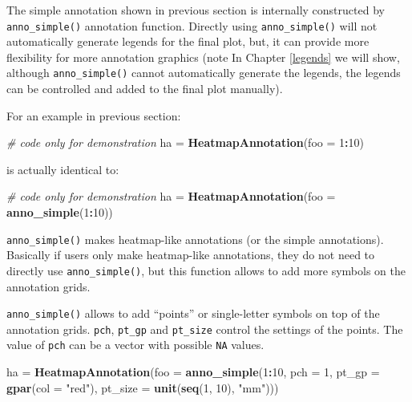 \documentclass[]{book}
\newenvironment{Shaded}{\begin{snugshade}}{\end{snugshade}}
\newcommand{\KeywordTok}[1]{\textcolor[rgb]{0.13,0.29,0.53}{\textbf{#1}}}
\newcommand{\DataTypeTok}[1]{\textcolor[rgb]{0.13,0.29,0.53}{#1}}
\newcommand{\DecValTok}[1]{\textcolor[rgb]{0.00,0.00,0.81}{#1}}
\newcommand{\StringTok}[1]{\textcolor[rgb]{0.31,0.60,0.02}{#1}}
\newcommand{\CommentTok}[1]{\textcolor[rgb]{0.56,0.35,0.01}{\textit{#1}}}
\newcommand{\OperatorTok}[1]{\textcolor[rgb]{0.81,0.36,0.00}{\textbf{#1}}}
\newcommand{\NormalTok}[1]{#1}
\theoremstyle{definition}
\theoremstyle{definition}
\theoremstyle{definition}
\theoremstyle{remark}
\begin{document}
The simple annotation shown in previous section is internally
constructed by \texttt{anno\_simple()} annotation function. Directly
using \texttt{anno\_simple()} will not automatically generate legends
for the final plot, but, it can provide more flexibility for more
annotation graphics (note In Chapter \ref{legends} we will show,
although \texttt{anno\_simple()} cannot automatically generate the
legends, the legends can be controlled and added to the final plot
manually).

For an example in previous section:

\begin{Shaded}
\begin{Highlighting}[]
\CommentTok{# code only for demonstration}
\NormalTok{ha =}\StringTok{ }\KeywordTok{HeatmapAnnotation}\NormalTok{(}\DataTypeTok{foo =} \DecValTok{1}\OperatorTok{:}\DecValTok{10}\NormalTok{)}
\end{Highlighting}
\end{Shaded}

is actually identical to:

\begin{Shaded}
\begin{Highlighting}[]
\CommentTok{# code only for demonstration}
\NormalTok{ha =}\StringTok{ }\KeywordTok{HeatmapAnnotation}\NormalTok{(}\DataTypeTok{foo =} \KeywordTok{anno_simple}\NormalTok{(}\DecValTok{1}\OperatorTok{:}\DecValTok{10}\NormalTok{))}
\end{Highlighting}
\end{Shaded}

\texttt{anno\_simple()} makes heatmap-like annotations (or the simple
annotations). Basically if users only make heatmap-like annotations,
they do not need to directly use \texttt{anno\_simple()}, but this
function allows to add more symbols on the annotation grids.

\texttt{anno\_simple()} allows to add ``points'' or single-letter
symbols on top of the annotation grids. \texttt{pch}, \texttt{pt\_gp}
and \texttt{pt\_size} control the settings of the points. The value of
\texttt{pch} can be a vector with possible \texttt{NA} values.

\begin{Shaded}
\begin{Highlighting}[]
\NormalTok{ha =}\StringTok{ }\KeywordTok{HeatmapAnnotation}\NormalTok{(}\DataTypeTok{foo =} \KeywordTok{anno_simple}\NormalTok{(}\DecValTok{1}\OperatorTok{:}\DecValTok{10}\NormalTok{, }\DataTypeTok{pch =} \DecValTok{1}\NormalTok{, }
    \DataTypeTok{pt_gp =} \KeywordTok{gpar}\NormalTok{(}\DataTypeTok{col =} \StringTok{"red"}\NormalTok{), }\DataTypeTok{pt_size =} \KeywordTok{unit}\NormalTok{(}\KeywordTok{seq}\NormalTok{(}\DecValTok{1}\NormalTok{, }\DecValTok{10}\NormalTok{), }\StringTok{"mm"}\NormalTok{)))}
\end{Highlighting}
\end{Shaded}
\end{document}
